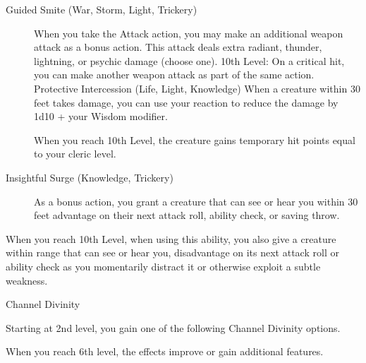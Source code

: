 \begin{description}
\item[Guided Smite (War, Storm, Light, Trickery)]
When you take the Attack action, you may make an additional weapon
attack as a bonus action. This attack deals extra radiant, thunder,
lightning, or psychic damage (choose one). 10th Level: On a critical
hit, you can make another weapon attack as part of the same action.
Protective Intercession (Life, Light, Knowledge) When a creature within
30 feet takes damage, you can use your reaction to reduce the damage by
1d10 + your Wisdom modifier.

When you reach 10th Level, the creature gains temporary hit points equal
to your cleric level.
\item[Insightful Surge (Knowledge, Trickery)]
As a bonus action, you grant a creature that can see or hear you within
30 feet advantage on their next attack roll, ability check, or saving
throw.
\end{description}

When you reach 10th Level, when using this ability, you also give a
creature within range that can see or hear you, disadvantage on its next
attack roll or ability check as you momentarily distract it or otherwise
exploit a subtle weakness.

Channel Divinity

Starting at 2nd level, you gain one of the following Channel Divinity
options.

When you reach 6th level, the effects improve or gain additional
features.

